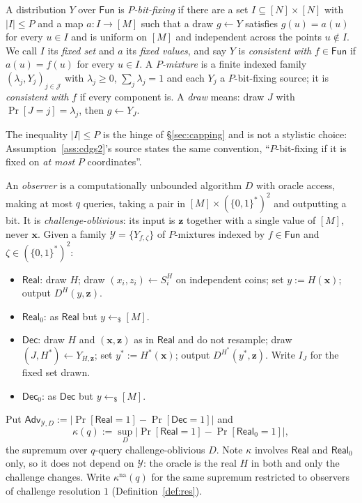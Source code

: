 \documentclass{aicr-solution}
\newcommand{\Fun}{\mathsf{Fun}}
\newcommand{\Adv}{\mathsf{Adv}}
\newcommand{\Real}{\mathsf{Real}}
\newcommand{\Dec}{\mathsf{Dec}}
\newcommand{\Prob}[1]{\Pr\!\left[#1\right]}
\newcommand{\bits}{\{0,1\}}
\newcommand{\vx}{\mathbf{x}}
\newcommand{\vz}{\mathbf{z}}
\newcommand{\kna}{\kappa^{\mathrm{na}}}
\begin{document}
\begin{definition}\label{def:bf}
A distribution $Y$ over $\Fun$ is \emph{$P$-bit-fixing} if there are a set
$I \subseteq [N]\times[N]$ with $|I| \le P$ and a map $a : I \to [M]$ such that a
draw $g \gets Y$ satisfies $g(u) = a(u)$ for every $u \in I$ and is uniform on
$[M]$ and independent across the points $u \notin I$. We call $I$ its \emph{fixed
set} and $a$ its \emph{fixed values}, and say $Y$ is \emph{consistent with}
$f \in \Fun$ if $a(u) = f(u)$ for every $u \in I$. A \emph{$P$-mixture} is a
finite indexed family $(\lambda_j, Y_j)_{j \in \mathcal{J}}$ with $\lambda_j \ge 0$,
$\sum_j \lambda_j = 1$ and each $Y_j$ a $P$-bit-fixing source; it is
\emph{consistent with} $f$ if every component is. A \emph{draw} means: draw $J$
with $\Prob{J = j} = \lambda_j$, then $g \gets Y_J$.
\end{definition}

The inequality $|I| \le P$ is the hinge of \S\ref{sec:capping} and is not a
stylistic choice: Assumption~\ref{ass:cdgs2}'s source states the same convention,
``$P$-bit-fixing if it is fixed on \emph{at most} $P$ coordinates''.

\begin{definition}\label{def:obs}
An \emph{observer} is a computationally unbounded algorithm $D$ with oracle access,
making at most $q$ queries, taking a pair in $[M] \times (\bits^{*})^{2}$ and
outputting a bit. It is \emph{challenge-oblivious}: its input is $\vz$ together
with a single value of $[M]$, never $\vx$. Given a family
$\mathcal{Y} = \{Y_{f,\zeta}\}$ of $P$-mixtures indexed by $f \in \Fun$ and
$\zeta \in (\bits^{*})^{2}$:
\begin{itemize}[leftmargin=1.4em,itemsep=1pt]
\item $\Real$: draw $H$; draw $(x_i,z_i) \gets S_i^{H}$ on independent coins; set
  $y := H(\vx)$; output $D^{H}(y,\vz)$.
\item $\Real_0$: as $\Real$ but $y \gets_{\$} [M]$.
\item $\Dec$: draw $H$ and $(\vx,\vz)$ as in $\Real$ and do not resample; draw
  $(J,H^{*}) \gets Y_{H,\vz}$; set $y^{*} := H^{*}(\vx)$; output
  $D^{H^{*}}(y^{*},\vz)$. Write $I_J$ for the fixed set drawn.
\item $\Dec_0$: as $\Dec$ but $y \gets_{\$} [M]$.
\end{itemize}
Put $\Adv_{\mathcal{Y},D} := |\Prob{\Real = 1} - \Prob{\Dec = 1}|$ and
\[
  \kappa(q) := \sup_{D} \bigl|\Prob{\Real = 1} - \Prob{\Real_0 = 1}\bigr| ,
\]
the supremum over $q$-query challenge-oblivious $D$. Note $\kappa$ involves
$\Real$ and $\Real_0$ only, so it does not depend on $\mathcal{Y}$: the oracle is
the real $H$ in both and only the challenge changes. Write $\kna(q)$ for the same
supremum restricted to observers of challenge resolution $1$
(Definition~\ref{def:res}).
\end{definition}
\end{document}
